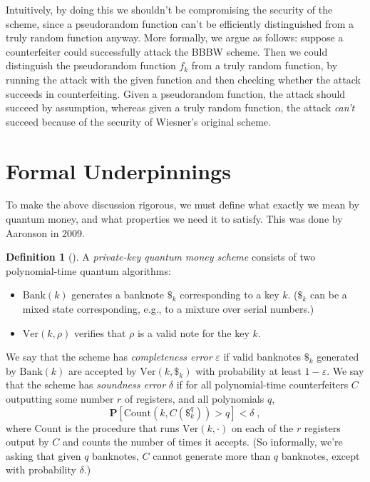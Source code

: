 \documentclass[12pt]{report}
\theoremstyle{plain}
\theoremstyle{definition}
\newtheorem{definition}[theorem]{Definition}
\newcommand{\eps}{\varepsilon}
\renewcommand{\Pr}{\mathbf{P}}
\begin{document}
Intuitively, by doing this we shouldn't be compromising the security of the scheme, since a pseudorandom function can't be efficiently distinguished from a truly random function anyway.  More formally, we argue as follows: suppose a counterfeiter could successfully attack the BBBW scheme.  Then we could distinguish the pseudorandom function $f_k$ from a truly random function, by running the attack with the given function and then checking whether the attack succeeds in counterfeiting.  Given a pseudorandom function, the attack should succeed by assumption, whereas given a truly random function, the attack {\em can't} succeed because of the security of Wiesner's original scheme.

\section{Formal Underpinnings}

To make the above discussion rigorous, we must define what exactly we mean by quantum money, and what properties we need it to satisfy.  This was done by Aaronson \cite{Aar09} in 2009.

\begin{definition}[\cite{Aar09}] \label{def:private-key-quantum-money}
A \emph{private-key quantum money scheme} consists of two polynomial-time quantum algorithms:
\begin{itemize}
\item $\mathrm{Bank}(k)$ generates a banknote $\$_k$ corresponding to a key $k$. ($\$_k$ can be a mixed state corresponding, e.g., to a mixture over serial numbers.)
\item $\mathrm{Ver}(k,\rho)$ verifies that $\rho$ is a valid note for the key $k$.
\end{itemize}
We say that the scheme has \emph{completeness error} $\eps$ if valid banknotes $\$_k$ generated by $\mathrm{Bank}(k)$ are accepted by $\mathrm{Ver}(k,\$_k)$ with probability at least $1-\eps$.
We say that the scheme has {\em soundness error} $\delta$ if for all polynomial-time counterfeiters $C$ outputting some number $r$ of registers, and all polynomials $q$,
\[
\Pr[\mathrm{Count}(k,C(\$_k^q)) > q] < \delta \;,
\]
where $\mathrm{Count}$ is the procedure that runs $\mathrm{Ver}(k,\cdot)$ on each of the $r$ registers output by $C$ and counts the number of times it accepts. (So informally, we're asking that given $q$ banknotes, $C$ cannot generate more than $q$ banknotes, except with probability $\delta$.)
\end{definition}
\end{document}
